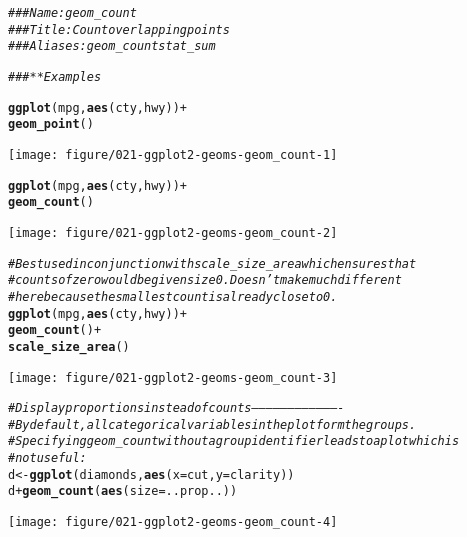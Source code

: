 \documentclass[a4paper,titlepage]{tufte-handout}\usepackage[]{graphicx}\usepackage[]{color}
\makeatletter
\def\maxwidth{ %
  \ifdim\Gin@nat@width>\linewidth
    \linewidth
  \else
    \Gin@nat@width
  \fi
}
\newcommand{\hlcom}[1]{\textcolor[rgb]{0.678,0.584,0.686}{\textit{#1}}}%
\newcommand{\hlopt}[1]{\textcolor[rgb]{0,0,0}{#1}}%
\newcommand{\hlstd}[1]{\textcolor[rgb]{0.345,0.345,0.345}{#1}}%
\newcommand{\hlkwb}[1]{\textcolor[rgb]{0.69,0.353,0.396}{#1}}%
\newcommand{\hlkwc}[1]{\textcolor[rgb]{0.333,0.667,0.333}{#1}}%
\newcommand{\hlkwd}[1]{\textcolor[rgb]{0.737,0.353,0.396}{\textbf{#1}}}%
\newenvironment{kframe}{%
 \def\at@end@of@kframe{}%
 \ifinner\ifhmode%
  \def\at@end@of@kframe{\end{minipage}}%
  \begin{minipage}{\columnwidth}%
 \fi\fi%
 \def\FrameCommand##1{\hskip\@totalleftmargin \hskip-\fboxsep
 \colorbox{shadecolor}{##1}\hskip-\fboxsep
     \hskip-\linewidth \hskip-\@totalleftmargin \hskip\columnwidth}%
 \MakeFramed {\advance\hsize-\width
   \@totalleftmargin\z@ \linewidth\hsize
   \@setminipage}}%
 {\par\unskip\endMakeFramed%
 \at@end@of@kframe}
\newenvironment{knitrout}{}{} %
\makeatother
\begin{document}
\begin{knitrout}
\color{fgcolor}\begin{kframe}
\begin{alltt}
\hlcom{### Name: geom_count}
\hlcom{### Title: Count overlapping points}
\hlcom{### Aliases: geom_count stat_sum}

\hlcom{### ** Examples}

\hlkwd{ggplot}\hlstd{(mpg,} \hlkwd{aes}\hlstd{(cty, hwy))} \hlopt{+}
 \hlkwd{geom_point}\hlstd{()}
\end{alltt}
\end{kframe}
\texttt{[image: figure/021-ggplot2-geoms-geom\_count-1]} 
\begin{kframe}\begin{alltt}
\hlkwd{ggplot}\hlstd{(mpg,} \hlkwd{aes}\hlstd{(cty, hwy))} \hlopt{+}
 \hlkwd{geom_count}\hlstd{()}
\end{alltt}
\end{kframe}
\texttt{[image: figure/021-ggplot2-geoms-geom\_count-2]} 
\begin{kframe}\begin{alltt}
\hlcom{# Best used in conjunction with scale_size_area which ensures that}
\hlcom{# counts of zero would be given size 0. Doesn't make much different}
\hlcom{# here because the smallest count is already close to 0.}
\hlkwd{ggplot}\hlstd{(mpg,} \hlkwd{aes}\hlstd{(cty, hwy))} \hlopt{+}
 \hlkwd{geom_count}\hlstd{()} \hlopt{+}
 \hlkwd{scale_size_area}\hlstd{()}
\end{alltt}
\end{kframe}
\texttt{[image: figure/021-ggplot2-geoms-geom\_count-3]} 
\begin{kframe}\begin{alltt}
\hlcom{# Display proportions instead of counts -------------------------------------}
\hlcom{# By default, all categorical variables in the plot form the groups.}
\hlcom{# Specifying geom_count without a group identifier leads to a plot which is}
\hlcom{# not useful:}
\hlstd{d} \hlkwb{<-} \hlkwd{ggplot}\hlstd{(diamonds,} \hlkwd{aes}\hlstd{(}\hlkwc{x} \hlstd{= cut,} \hlkwc{y} \hlstd{= clarity))}
\hlstd{d} \hlopt{+} \hlkwd{geom_count}\hlstd{(}\hlkwd{aes}\hlstd{(}\hlkwc{size} \hlstd{= ..prop..))}
\end{alltt}
\end{kframe}
\texttt{[image: figure/021-ggplot2-geoms-geom\_count-4]} 
\begin{kframe}\begin{alltt}

\end{alltt}
\end{kframe}
\end{knitrout}
\end{document}
